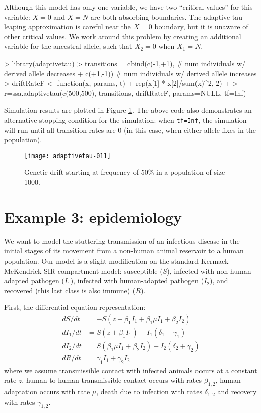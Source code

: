 \documentclass[11pt,nogin]{article}
\begin{document}
Although this model has only one variable, we have two ``critical values'' for this variable: $X=0$ and $X=N$ are both absorbing boundaries.  The adaptive tau-leaping approximation is careful near the $X=0$ boundary, but it is unaware of other critical values.  We work around this problem by creating an additional variable for the ancestral allele, such that $X_2 = 0$ when $X_1 = N$.
\begin{Schunk}
\begin{Sinput}
> library(adaptivetau)
> transitions = cbind(c(-1,+1), # num individuals w/ derived allele decreases
+                     c(+1,-1)) # num individuals w/ derived allele increases
> driftRateF <- function(x, params, t) {
+   rep(x[1] * x[2]/sum(x)^2, 2)
+ }
> r=ssa.adaptivetau(c(500,500), transitions, driftRateF, params=NULL, tf=Inf)
\end{Sinput}
\end{Schunk}
Simulation results are plotted in Figure \ref{fig-drift}.  The above code also demonstrates an alternative stopping condition for the simulation: when \texttt{tf=Inf}, the simulation will run until all transition rates are 0 (in this case, when either allele fixes in the population).
\begin{figure}
  \centerline{
\texttt{[image: adaptivetau-011]}
}\caption{\label{fig-drift} Genetic drift starting at frequency of 50\% in a population of size 1000.}
\end{figure}


\section*{Example 3: epidemiology}
We want to model the stuttering transmission of an infectious disease in the initial stages of its movement from a non-human animal reservoir to a human population.  Our model is a slight modification on the standard Kermack-McKendrick SIR compartment model: susceptible ($S$), infected with non-human-adapted pathogen ($I_1$), infected with human-adapted pathogen ($I_2$), and recovered (this last class is also immune) ($R$).

First, the differential equation representation:
\[
\begin{split}
  dS/dt & = -S(z + \beta_1 I_1 + \beta_1 \mu I_1 + \beta_2 I_2)\\
  dI_{1}/dt & = S(z + \beta_1 I_1) - I_1(\delta_1 + \gamma_1)\\
  dI_{2}/dt & = S(\beta_1 \mu I_1 + \beta_2 I_2) - I_2(\delta_2 + \gamma_2)\\
  dR/dt & = \gamma_1 I_1 + \gamma_2 I_2
\end{split}
\]
where we assume transmissible contact with infected animals occurs at a constant rate $z$, human-to-human transmissible contact occurs with rates $\beta_{1,2}$, human adaptation occurs with rate $\mu$, death due to infection with rates $\delta_{1,2}$ and recovery with rates $\gamma_{1,2}$.
\end{document}
